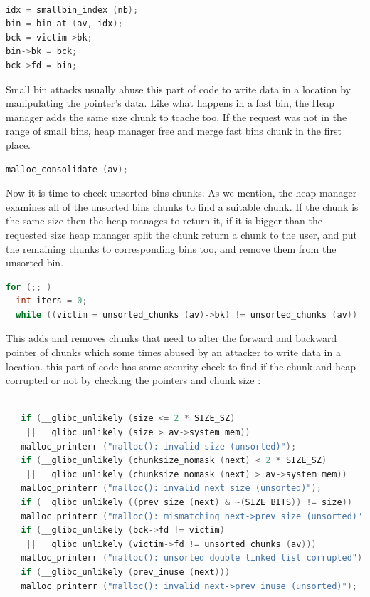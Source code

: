 \documentclass{masterthesis}
\begin{document}
\begin{lstlisting}[language=c,frame=tlrb]

idx = smallbin_index (nb);
bin = bin_at (av, idx);
bck = victim->bk;
bin->bk = bck;
bck->fd = bin;
\end{lstlisting}

Small bin attacks usually abuse this part of code to write data in a location by manipulating the pointer's data. Like what happens in a fast bin, the Heap manager adds the same size chunk to tcache too. If the request was not in the range of small bins, heap manager free and merge fast bins chunk in the first place.
\begin{lstlisting}[language=c,frame=tlrb]
malloc_consolidate (av);
\end{lstlisting}

Now it is time to check unsorted bins chunks. As we mention, the heap manager examines all of the unsorted bins chunks to find a suitable chunk. If the chunk is the same size then the heap manages to return it, if it is bigger than the requested size heap manager split the chunk return a chunk to the user, and put the remaining chunks to corresponding bins too, and remove them from the unsorted bin.
\begin{lstlisting}[language=c]
for (;; )  
  int iters = 0;
  while ((victim = unsorted_chunks (av)->bk) != unsorted_chunks (av))
\end{lstlisting}
This adds and removes chunks that need to alter the forward and backward pointer of chunks which some times abused by an attacker to write data in a location. this part of code has some security check to find if the chunk and heap corrupted or not by checking the pointers and chunk size :
\begin{lstlisting}[language=c,frame=tlrb]

   if (__glibc_unlikely (size <= 2 * SIZE_SZ)
    || __glibc_unlikely (size > av->system_mem))
   malloc_printerr ("malloc(): invalid size (unsorted)");
   if (__glibc_unlikely (chunksize_nomask (next) < 2 * SIZE_SZ)
    || __glibc_unlikely (chunksize_nomask (next) > av->system_mem))
   malloc_printerr ("malloc(): invalid next size (unsorted)");
   if (__glibc_unlikely ((prev_size (next) & ~(SIZE_BITS)) != size))
   malloc_printerr ("malloc(): mismatching next->prev_size (unsorted)");
   if (__glibc_unlikely (bck->fd != victim)
    || __glibc_unlikely (victim->fd != unsorted_chunks (av)))
   malloc_printerr ("malloc(): unsorted double linked list corrupted");
   if (__glibc_unlikely (prev_inuse (next)))
   malloc_printerr ("malloc(): invalid next->prev_inuse (unsorted)");
\end{lstlisting}
\end{document}
